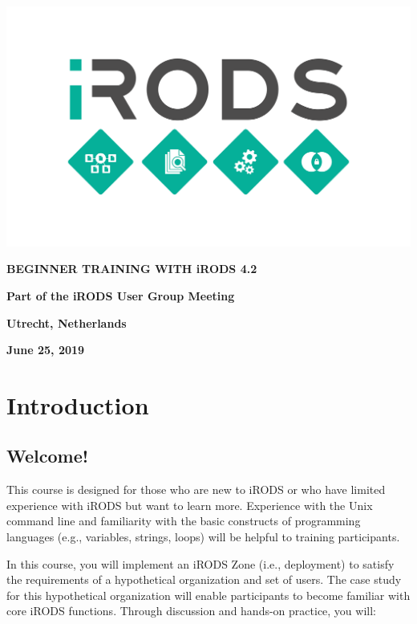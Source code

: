\documentclass[10pt,oneside]{memoir}
\begin{document}
\thispagestyle{empty}

\centerline{\includegraphics[width=19cm]{diamond_logo}}

\begin{center}

\huge{\textbf{BEGINNER TRAINING WITH iRODS 4.2}}

\vspace{10mm}
\textbf{Part of the iRODS User Group Meeting}

\vspace{10mm}
\textbf{Utrecht, Netherlands}

\vspace{10mm}
\textbf{June 25, 2019}

\end{center}

\newpage

\frontmatter

\tableofcontents*
\newpage

\chapter{Introduction}

\section{Welcome!}

This course is designed for those who are new to iRODS or who have limited experience with iRODS but want to learn more. Experience with the Unix command line and familiarity with the basic constructs of programming languages (e.g., variables, strings, loops) will be helpful to training participants.

In this course, you will implement an iRODS Zone (i.e., deployment) to satisfy the requirements of a hypothetical organization and set of users. The case study for this hypothetical organization will enable participants to become familiar with core iRODS functions. Through discussion and hands-on practice, you will:
\end{document}

